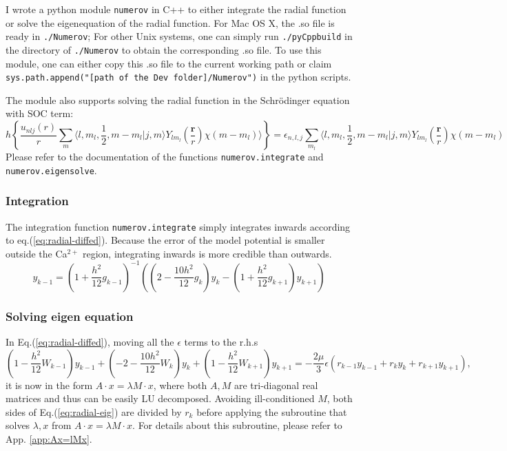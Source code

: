 \documentclass{article}
\begin{document}
I wrote a python module \texttt{numerov} in C++ to either integrate the radial function or solve the eigenequation of the radial function. For Mac OS X, the .so file is ready in \texttt{./Numerov}; For other Unix systems, one can simply run \texttt{./pyCppbuild} in the directory of \texttt{./Numerov} to obtain the corresponding .so file. To use this module, one can either copy this .so file to the current working path or claim \texttt{sys.path.append("[path of the Dev folder]/Numerov")} in the python scripts.

The module also supports solving the radial function in the Schr\"{o}dinger equation with SOC term:
\begin{equation*}
h \left\{\frac{u_{nlj}(r)}{r}\sum_{m}\langle l,m_l,\frac{1}{2},m-m_l|j,m\rangle Y_{lm_l}(\frac{\bm{r}}{r})\chi(m-m_l)\rangle\right\} = \epsilon_{n,l,j} \sum_{m_l}\langle l,m_l,\frac{1}{2},m-m_l|j,m\rangle Y_{lm_l}(\frac{\bm{r}}{r})\chi(m-m_l)
\end{equation*}
Please refer to the documentation of the functions \texttt{numerov.integrate} and \texttt{numerov.eigensolve}.

\subsubsection{Integration}
The integration function \texttt{numerov.integrate} simply integrates inwards according to eq.(\ref{eq:radial-diffed}). Because the error of the model potential is smaller outside the Ca$^{2+}$ region, integrating inwards is more credible than outwards.
\begin{equation}
y_{k-1} = \left(1+\frac{h^2}{12}g_{k-1}\right)^{-1} \left((2 -\frac{10 h^2}{12}g_k)y_k - (1+\frac{h^2}{12}g_{k+1})y_{k+1}\right)
\end{equation}

\subsubsection{Solving eigen equation}
In Eq.(\ref{eq:radial-diffed}), moving all the $\epsilon$ terms to the r.h.s
\begin{equation}
(1-\frac{h^2}{12}W_{k-1})y_{k-1} + (-2-\frac{10h^2}{12}W_k)y_k + (1-\frac{h^2}{12}W_{k+1})y_{k+1} = -\frac{2\mu}{3}\epsilon(r_{k-1}y_{k-1} + r_ky_k + r_{k+1}y_{k+1}),\label{eq:radial-eig}
\end{equation}
it is now in the form $A\cdot x =\lambda M\cdot x$, where both $A,M$ are tri-diagonal real matrices and thus can be easily LU decomposed. Avoiding ill-conditioned $M$, both sides of Eq.(\ref{eq:radial-eig}) are divided by $r_k$ before applying the subroutine that solves $\lambda, x$ from $A\cdot x =\lambda M\cdot x$. For details about this subroutine, please refer to App. \ref{app:Ax=lMx}.
\end{document}
